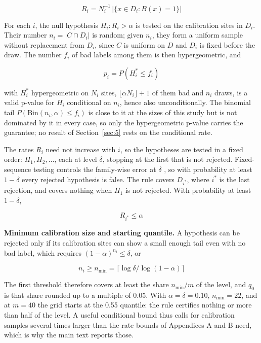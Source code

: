 \documentclass{iopjournal}
\begin{document}
\[
R_i = N_i^{-1} \, \lvert \{x \in D_i : B(x) = 1\} \rvert
\]

For each \(i\), the null hypothesis \(H_i : R_i > \alpha\) is tested on the calibration sites in \(D_i\). Their number \(n_i = |C \cap D_i|\) is random; given \(n_i\), they form a uniform sample without replacement from \(D_i\), since \(C\) is uniform on \(D\) and \(D_i\) is fixed before the draw. The number \(f_i\) of bad labels among them is then hypergeometric, and

\[
p_i = P(H_i^\ast \le f_i)
\]

with \(H_i^\ast\) hypergeometric on \(N_i\) sites, \(\lfloor \alpha N_i \rfloor + 1\) of them bad and \(n_i\) draws, is a valid p-value for \(H_i\) conditional on \(n_i\), hence also unconditionally. The binomial tail \(P(\mathrm{Bin}(n_i, \alpha) \le f_i)\) is close to it at the sizes of this study but is not dominated by it in every case, so only the hypergeometric p-value carries the guarantee; no result of Section~\ref{sec:5} rests on the conditional rate.

The rates \(R_i\) need not increase with \(i\), so the hypotheses are tested in a fixed order: \(H_1, H_2, \dots\), each at level \(\delta\), stopping at the first that is not rejected. Fixed-sequence testing controls the family-wise error at \(\delta\) \cite{WestfallKrishen2001}, so with probability at least \(1 - \delta\) every rejected hypothesis is false. The rule covers \(D_{i^\ast}\), where \(i^\ast\) is the last rejection, and covers nothing when \(H_1\) is not rejected. With probability at least \(1 - \delta\),

\[
R_{i^\ast} \le \alpha
\]

\textbf{Minimum calibration size and starting quantile.} A hypothesis can be rejected only if its calibration sites can show a small enough tail even with no bad label, which requires \((1 - \alpha)^{n_i} \le \delta\), or

\[
n_i \ge n_{\min} = \lceil \log \delta / \log (1 - \alpha) \rceil
\]

The first threshold therefore covers at least the share \(n_{\min}/m\) of the level, and \(q_0\) is that share rounded up to a multiple of 0.05. With \(\alpha = \delta = 0.10\), \(n_{\min} = 22\), and at \(m = 40\) the grid starts at the 0.55 quantile: the rule certifies nothing or more than half of the level. A useful conditional bound thus calls for calibration samples several times larger than the rate bounds of Appendices A and B need, which is why the main text reports those.
\end{document}
